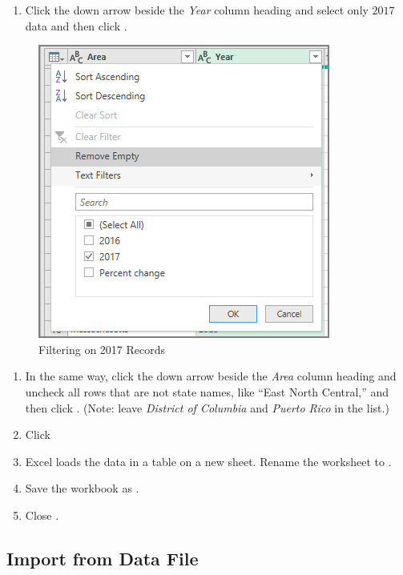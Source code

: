 \begin{enumerate}[resume]
	\item Click the down arrow beside the \textit{Year} column heading and select only $ 2017 $ data and then click .
\end{enumerate}

\begin{figure}[H]
	\centering
	\includegraphics[width=\maxwidth{.75\linewidth}]{gfx/ch07_fig02f}
	\caption{Filtering on 2017 Records}
	\label{07:fig02f}
\end{figure}

\begin{enumerate}[resume]
	\item In the same way, click the down arrow beside the \textit{Area} column heading and uncheck all rows that are not state names, like ``East North Central,'' and then click . (Note: leave \textit{District of Columbia} and \textit{Puerto Rico} in the list.)
	\item Click 
	\item Excel loads the data in a table on a new sheet. Rename the worksheet to .
	\item Save the workbook as .
	\item Close .
\end{enumerate}

\subsection{Import from Data File}\label{07:ImportFromDataFile}

